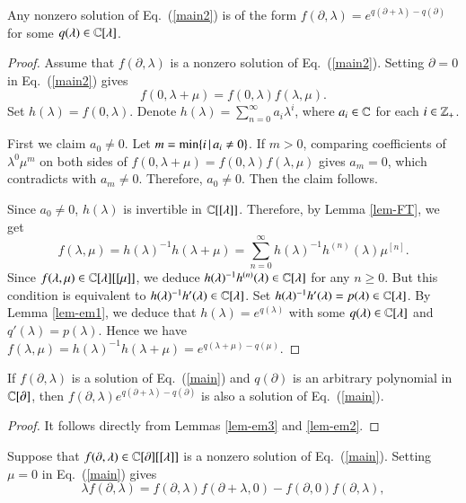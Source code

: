 \documentclass[12pt]{amsart}
\begin{document}
\begin{lem}\label{lem-em2}
Any nonzero solution of Eq.~(\ref{main2}) is  of the form $f(\partial, \lambda)=e^{q(\partial+\lambda)-q(\partial)}$ for some $q(\lambda)\in \mathbb{C}[\lambda]$.
\end{lem}
\begin{proof}
Assume that $f(\partial,\lambda)$ is a nonzero solution of Eq.~(\ref{main2}).
Setting $\partial=0$ in Eq.~(\ref{main2}) gives
\begin{equation}\label{main3}
f(0, \lambda+\mu)=f(0, \lambda)f(\lambda,\mu).
\end{equation}
Set $h(\lambda)=f(0, \lambda)$.  Denote $h(\lambda)=\sum_{n=0}^{\infty}a_i \lambda^i$, where $a_i\in \mathbb{C}$ for each $i\in \mathbb{Z}_+$.

First we claim $a_0\neq 0$.
Let $m={\rm min}\{i\,|\,a_i\neq 0\}$. If $m>0$, comparing coefficients of $\lambda^0\mu^m$ on both sides of $f(0, \lambda+\mu)=f(0, \lambda)f(\lambda,\mu)$ gives $a_m=0$, which contradicts with $a_m\neq 0$. Therefore, $a_0\neq 0$. Then the claim follows.

Since $a_0\neq 0$, $h(\lambda)$ is invertible in $\mathbb{C}[[\lambda]]$.
Therefore, by Lemma \ref{lem-FT}, we get
\[
f(\lambda,\mu)=h(\lambda)^{-1}h(\lambda+\mu)=\sum_{n=0}^{\infty} h(\lambda)^{-1}h^{(n)}(\lambda)\mu^{[n]}.
\]
Since
$f(\lambda,\mu)\in\mathbb{C}[\lambda][[\mu]]$,
we deduce $h(\lambda)^{-1}h^{(n)}(\lambda)\in \mathbb{C}[\lambda]$ for any $n\geq 0$.
But this condition is equivalent to
$h(\lambda)^{-1}h'(\lambda)\in \mathbb{C}[\lambda]$.
Set $h(\lambda)^{-1}h'(\lambda)=p(\lambda)\in \mathbb{C}[\lambda]$.
By Lemma \ref{lem-em1}, we deduce that $h(\lambda)=e^{q(\lambda)}$ with some $q(\lambda)\in \mathbb{C}[\lambda]$ and $q'(\lambda)=p(\lambda)$. Hence we have $f(\lambda, \mu)=h(\lambda)^{-1}h(\lambda+\mu)=e^{q(\lambda+\mu)-q(\mu)}$.
\end{proof}
\begin{pro}\label{prop1}If $f(\partial, \lambda)$ is a solution of Eq.~(\ref{main}) and $q(\partial)$ is an arbitrary  polynomial in $\mathbb{C}[\partial]$, then $f(\partial, \lambda)e^{q(\partial+\lambda)-q(\partial)}$ is also a solution of Eq.~(\ref{main}).
\end{pro}
\begin{proof}
It follows directly from Lemmas \ref{lem-em3} and \ref{lem-em2}.
\end{proof}
Suppose that $f(\partial, \lambda)\in \mathbb{C}[\partial][[\lambda]]$ is a nonzero solution
of Eq.~(\ref{main}).
Setting $\mu=0$ in Eq.~(\ref{main}) gives
$$\lambda f(\partial, \lambda)=f(\partial, \lambda)f(\partial+\lambda,0)
-f(\partial, 0)f(\partial, \lambda),$$
\end{document}
